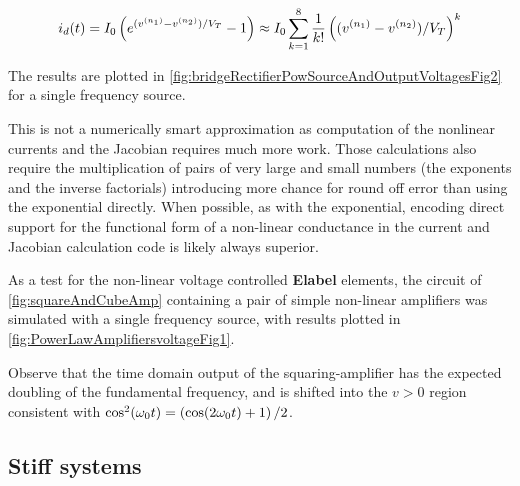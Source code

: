\begin{dmath}\label{eqn:ece1254projectReport:1480}
i_d(t) = I_0 \lr{ e^{(v^{(n_1)} - v^{(n_2)})/V_T} - 1}
\approx
I_0 \sum_{k=1}^8
\inv{k!} \lr{(v^{(n_1)} - v^{(n_2)})/V_T}^k
\end{dmath}

The results are plotted in \cref{fig:bridgeRectifierPowSourceAndOutputVoltagesFig2} for a single frequency source.


This is not a numerically smart approximation as computation of the nonlinear currents and the Jacobian requires much more work.
Those calculations also require the multiplication of pairs of very large and small numbers (the exponents and the inverse factorials) introducing more chance for round off error than using the exponential directly.
When possible, as with the exponential, encoding direct support for the functional form of a non-linear conductance in the current and Jacobian calculation code is likely always superior.

As a test for the non-linear voltage controlled \textbf{Elabel} elements, the circuit of \cref{fig:squareAndCubeAmp} containing a pair of simple non-linear amplifiers was simulated with a single frequency source, with results plotted in \cref{fig:PowerLawAmplifiersvoltageFig1}.



Observe that the time domain output of the squaring-amplifier
has the expected doubling of the fundamental frequency, and is shifted into the \( v > 0 \) region 
consistent with \( \cos^2(\omega_0 t) = \left(\cos(2 \omega_0 t) + 1\right)/2 \).

\subsection{Stiff systems}

